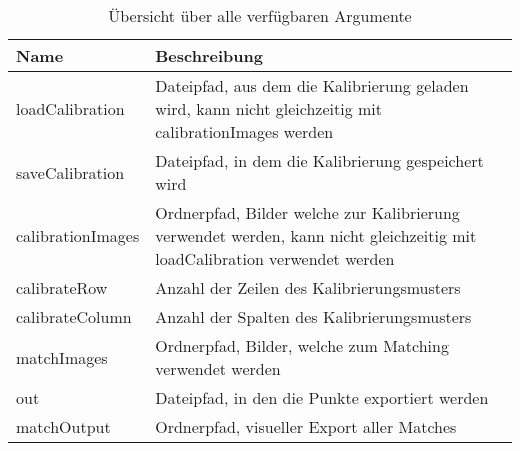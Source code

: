 \begin{table}[]
\centering
\begin{tabularx}{\textwidth}{ lX }
\hline
Name              & Beschreibung                                                                                                              \\ \hline
loadCalibration   & Dateipfad, aus dem die Kalibrierung geladen wird, kann nicht gleichzeitig mit calibrationImages werden                    \\
saveCalibration   & Dateipfad, in dem die Kalibrierung gespeichert wird                                                                       \\
calibrationImages & Ordnerpfad, Bilder welche zur Kalibrierung verwendet werden, kann nicht gleichzeitig mit loadCalibration verwendet werden \\
calibrateRow      & Anzahl der Zeilen des Kalibrierungsmusters                                                                                \\
calibrateColumn   & Anzahl der Spalten des Kalibrierungsmusters                                                                               \\
matchImages       & Ordnerpfad, Bilder, welche zum Matching verwendet werden                                                                  \\
out               & Dateipfad, in den die Punkte exportiert werden                                                                            \\
matchOutput       & Ordnerpfad, visueller Export aller Matches                                                                                \\ \hline
\end{tabularx}
\caption{Übersicht über alle verfügbaren Argumente}
\label{tab:arguments}
\end{table}